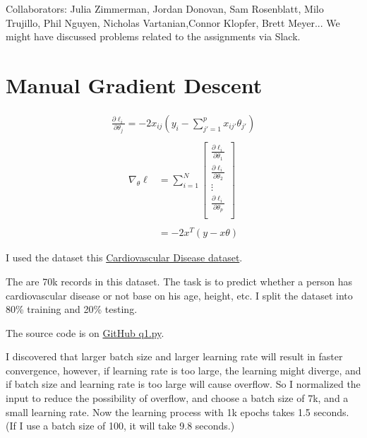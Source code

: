 \newcommand\chapternumber{3}

\usepackage{enumerate}
\usepackage{float}


Collaborators: Julia Zimmerman, Jordan Donovan, Sam Rosenblatt, Milo Trujillo, Phil Nguyen, Nicholas Vartanian,Connor Klopfer, Brett Meyer...
We might have discussed problems related to the assignments via Slack.
\section{Manual Gradient Descent}
\begin{align*}
    \frac{\partial \ell_i}{\partial \theta_j} = -2 x_{ij} (y_i - \sum_{j'=1}^{p} x_{ij'} \theta_{j'}) \\
\end{align*}
\begin{align*}
    \nabla_{\theta} \ell & = \sum_{i=1}^{N} \begin{bmatrix}
        \frac{\partial \ell_i}{\partial \theta_1} \\
        \frac{\partial \ell_i}{\partial \theta_2} \\
        \vdots                                    \\
        \frac{\partial \ell_i}{\partial \theta_p} \\
    \end{bmatrix} \\\\
                         & = -2 x^T (y-x\theta)
\end{align*}

I used the dataset this \href{https://www.kaggle.com/sulianova/cardiovascular-disease-dataset}{Cardiovascular Disease dataset}.

The are 70k records in this dataset.
The task is to predict whether a person has cardiovascular disease or not base on his age, height, etc.
I split the dataset into 80\% training and 20\% testing.

The source code is on \href{https://github.com/liusida/ds2/blob/main/assignment3/code/q1.py}{GitHub q1.py}.

I discovered that larger batch size and larger learning rate will result in faster convergence,
however, if learning rate is too large, the learning might diverge,
and if batch size and learning rate is too large will cause overflow.
So I normalized the input to reduce the possibility of overflow, and choose a batch size of 7k, and a small learning rate.
Now the learning process with 1k epochs takes 1.5 seconds. (If I use a batch size of 100, it will take 9.8 seconds.)

